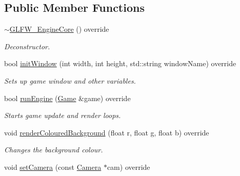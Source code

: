 \subsection*{Public Member Functions}
\begin{DoxyCompactItemize}
\item 
\hypertarget{class_g_l_f_w___engine_core_adf17916892982f1103140b22dc1b37be}{\hyperlink{class_g_l_f_w___engine_core_adf17916892982f1103140b22dc1b37be}{$\sim$\+G\+L\+F\+W\+\_\+\+Engine\+Core} () override}\label{class_g_l_f_w___engine_core_adf17916892982f1103140b22dc1b37be}

\begin{DoxyCompactList}\small\item\em Deconstructor. \end{DoxyCompactList}\item 
\hypertarget{class_g_l_f_w___engine_core_aa786131ec64e7ee6779c3ac1ee8507ce}{bool \hyperlink{class_g_l_f_w___engine_core_aa786131ec64e7ee6779c3ac1ee8507ce}{init\+Window} (int width, int height, std\+::string window\+Name) override}\label{class_g_l_f_w___engine_core_aa786131ec64e7ee6779c3ac1ee8507ce}

\begin{DoxyCompactList}\small\item\em Sets up game window and other variables. \end{DoxyCompactList}\item 
\hypertarget{class_g_l_f_w___engine_core_adf9266f1a9b5d97992691224f0f20c7b}{bool \hyperlink{class_g_l_f_w___engine_core_adf9266f1a9b5d97992691224f0f20c7b}{run\+Engine} (\hyperlink{class_game}{Game} \&game) override}\label{class_g_l_f_w___engine_core_adf9266f1a9b5d97992691224f0f20c7b}

\begin{DoxyCompactList}\small\item\em Starts game update and render loops. \end{DoxyCompactList}\item 
\hypertarget{class_g_l_f_w___engine_core_a6031a54b0978d6e0fd1be3f292c2059f}{void \hyperlink{class_g_l_f_w___engine_core_a6031a54b0978d6e0fd1be3f292c2059f}{render\+Coloured\+Background} (float r, float g, float b) override}\label{class_g_l_f_w___engine_core_a6031a54b0978d6e0fd1be3f292c2059f}

\begin{DoxyCompactList}\small\item\em Changes the background colour. \end{DoxyCompactList}\item 
\hypertarget{class_g_l_f_w___engine_core_a2aba4fb8a635f96fc4057ba841670a29}{void \hyperlink{class_g_l_f_w___engine_core_a2aba4fb8a635f96fc4057ba841670a29}{set\+Camera} (const \hyperlink{class_camera}{Camera} $\ast$cam) override}\label{class_g_l_f_w___engine_core_a2aba4fb8a635f96fc4057ba841670a29}


\end{DoxyCompactItemize}
